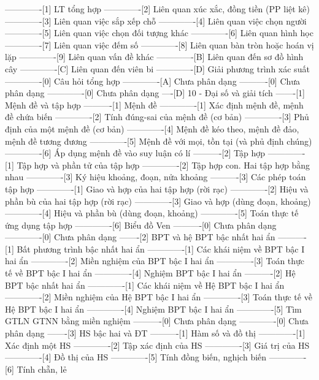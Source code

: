 -------------[1] LT tổng hợp
-------------[2] Liên quan xúc xắc, đồng tiền (PP liệt kê)
-------------[3] Liên quan việc sắp xếp chỗ
-------------[4] Liên quan việc chọn người
-------------[5] Liên quan việc chọn đối tượng khác
-------------[6] Liên quan hình học
-------------[7] Liên quan việc đếm số
-------------[8] Liên quan bàn tròn hoặc hoán vị lặp
-------------[9] Liên quan vấn đề khác
-------------[B] Liên quan đến sơ đồ hình cây
-------------[C] Liên quan đến viên bi
-------------[D] Giải phương trình xác suất
-------------[0] Câu hỏi tổng hợp
-------------[A] Chưa phân dạng
----------[0] Chưa phân dạng
-------------[0] Chưa phân dạng
----[D] 10 - Đại số và giải tích
-------[1] Mệnh đề và tập hợp
----------[1] Mệnh đề
-------------[1] Xác định mệnh đề, mệnh đề chứa biến
-------------[2] Tính đúng-sai của mệnh đề (cơ bản)
-------------[3] Phủ định của một mệnh đề (cơ bản)
-------------[4] Mệnh đề kéo theo, mệnh đề đảo, mệnh đề tương đương
-------------[5] Mệnh đề với mọi, tồn tại (và phủ định chúng)
-------------[6] Áp dụng mệnh đề vào suy luận có lí
----------[2] Tập hợp
-------------[1] Tập hợp và phần tử của tập hợp
-------------[2] Tập hợp con. Hai tập hợp bằng nhau
-------------[3] Ký hiệu khoảng, đoạn, nửa khoảng
----------[3] Các phép toán tập hợp
-------------[1] Giao và hợp của hai tập hợp (rời rạc)
-------------[2] Hiệu và phần bù của hai tập hợp (rời rạc)
-------------[3] Giao và hợp (dùng đoạn, khoảng)
-------------[4] Hiệu và phần bù (dùng đoạn, khoảng)
-------------[5] Toán thực tế ứng dụng tập hợp
-------------[6] Biểu đồ Ven
----------[0] Chưa phân dạng
-------------[0] Chưa phân dạng
-------[2] BPT và hệ BPT bậc nhất hai ẩn
----------[1] Bất phương trình bậc nhất hai ẩn
-------------[1] Các khái niệm về BPT bậc I hai ẩn
-------------[2] Miền nghiệm của BPT bậc I hai ẩn
-------------[3] Toán thực tế về BPT bậc I hai ẩn
-------------[4] Nghiệm BPT bậc I hai ẩn
----------[2] Hệ BPT bậc nhất hai ẩn
-------------[1] Các khái niệm về Hệ BPT bậc I hai ẩn
-------------[2] Miền nghiệm của Hệ BPT bậc I hai ẩn
-------------[3] Toán thực tế về Hệ BPT bậc I hai ẩn
-------------[4] Nghiệm BPT bậc I hai ẩn
-------------[5] Tìm GTLN GTNN bằng miền nghiệm
----------[0] Chưa phân dạng
-------------[0] Chưa phân dạng
-------[3] HS bậc hai và ĐT
----------[1] Hàm số và đồ thị
-------------[1] Xác định một HS
-------------[2] Tập xác định của HS
-------------[3] Giá trị của HS
-------------[4] Đồ thị của HS
-------------[5] Tính đồng biến, nghịch biến
-------------[6] Tính chẵn, lẻ
